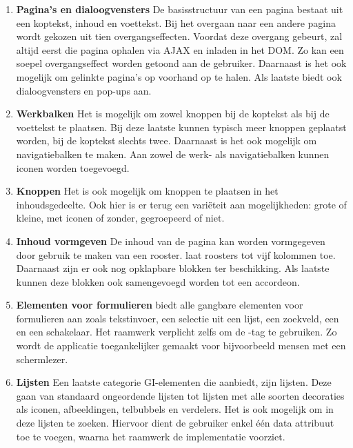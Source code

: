 \begin{enumerate}
\item \textbf{Pagina's en dialoogvensters}
De basisstructuur van een pagina bestaat uit een koptekst, inhoud en voettekst. 
Bij het overgaan naar een andere pagina wordt gekozen uit tien overgangseffecten. 
Voordat deze overgang gebeurt, zal \jqm{} altijd eerst die pagina ophalen via AJAX en inladen in het DOM. 
Zo kan een soepel overgangseffect worden getoond aan de gebruiker. 
Daarnaast is het ook mogelijk om gelinkte pagina's op voorhand op te halen. 
Als laatste biedt \jqm{} ook dialoogvensters en pop-ups aan. 

\item \textbf{Werkbalken}
Het is mogelijk om zowel knoppen bij de koptekst als bij de voettekst te plaatsen. 
Bij deze laatste kunnen typisch meer knoppen geplaatst worden, bij de koptekst slechts twee. 
Daarnaast is het ook mogelijk om navigatiebalken te maken. 
Aan zowel de werk- als navigatiebalken kunnen iconen worden toegevoegd.

\item \textbf{Knoppen}
Het is ook mogelijk om knoppen te plaatsen in het inhoudsgedeelte. 
Ook hier is er terug een variëteit aan mogelijkheden: grote of kleine, met iconen of zonder, gegroepeerd of niet. 

\item \textbf{Inhoud vormgeven}
De inhoud van de pagina kan worden vormgegeven door gebruik te maken van een rooster. 
\jqm{} laat roosters tot vijf kolommen toe. 
Daarnaast zijn er ook nog opklapbare blokken ter beschikking. 
Als laatste kunnen deze blokken ook samengevoegd worden tot een accordeon. 

\item \textbf{Elementen voor formulieren}
\jqm{} biedt alle gangbare elementen voor formulieren aan zoals tekstinvoer, een selectie uit een lijst, een zoekveld, een  en een schakelaar. 
Het raamwerk verplicht zelfs om de -tag te gebruiken. 
Zo wordt de applicatie toegankelijker gemaakt voor bijvoorbeeld mensen met een schermlezer.

\item \textbf{Lijsten}
Een laatste categorie GI-elementen die \jqm{} aanbiedt, zijn lijsten. 
Deze gaan van standaard ongeordende lijsten tot lijsten met alle soorten decoraties als iconen, afbeeldingen, telbubbels en verdelers. 
Het is ook mogelijk om in deze lijsten te zoeken. 
Hiervoor dient de gebruiker enkel één data attribuut toe te voegen, waarna het raamwerk de implementatie voorziet. 
\end{enumerate}

